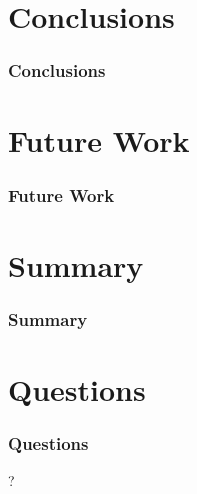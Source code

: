 \documentclass{beamer}
\begin{document}
\section{Conclusions}
\begin{frame}
\frametitle{Conclusions}

\end{frame}

\section{Future Work}
\begin{frame}
\frametitle{Future Work}

\end{frame}

\section{Summary}
\begin{frame}
\frametitle{Summary}
\tableofcontents
\end{frame}

\section{Questions}
\begin{frame}
\frametitle{Questions}
? 
\end{frame}
\end{document}
